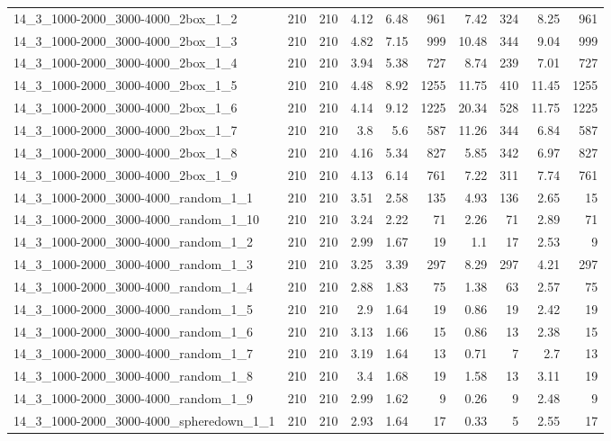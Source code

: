 \begin{center}
\begin{scriptsize}
\begin{longtable}{lrrrrrrrrr}
14\_3\_1000-2000\_3000-4000\_2box\_1\_2 & 210 & 210 & 4.12 & 6.48 & 961 & 7.42 & 324 & 8.25 & 961\\
14\_3\_1000-2000\_3000-4000\_2box\_1\_3 & 210 & 210 & 4.82 & 7.15 & 999 & 10.48 & 344 & 9.04 & 999\\
14\_3\_1000-2000\_3000-4000\_2box\_1\_4 & 210 & 210 & 3.94 & 5.38 & 727 & 8.74 & 239 & 7.01 & 727\\
14\_3\_1000-2000\_3000-4000\_2box\_1\_5 & 210 & 210 & 4.48 & 8.92 & 1255 & 11.75 & 410 & 11.45 & 1255\\
14\_3\_1000-2000\_3000-4000\_2box\_1\_6 & 210 & 210 & 4.14 & 9.12 & 1225 & 20.34 & 528 & 11.75 & 1225\\
14\_3\_1000-2000\_3000-4000\_2box\_1\_7 & 210 & 210 & 3.8 & 5.6 & 587 & 11.26 & 344 & 6.84 & 587\\
14\_3\_1000-2000\_3000-4000\_2box\_1\_8 & 210 & 210 & 4.16 & 5.34 & 827 & 5.85 & 342 & 6.97 & 827\\
14\_3\_1000-2000\_3000-4000\_2box\_1\_9 & 210 & 210 & 4.13 & 6.14 & 761 & 7.22 & 311 & 7.74 & 761\\
14\_3\_1000-2000\_3000-4000\_random\_1\_1 & 210 & 210 & 3.51 & 2.58 & 135 & 4.93 & 136 & 2.65 & 15\\
14\_3\_1000-2000\_3000-4000\_random\_1\_10 & 210 & 210 & 3.24 & 2.22 & 71 & 2.26 & 71 & 2.89 & 71\\
14\_3\_1000-2000\_3000-4000\_random\_1\_2 & 210 & 210 & 2.99 & 1.67 & 19 & 1.1 & 17 & 2.53 & 9\\
14\_3\_1000-2000\_3000-4000\_random\_1\_3 & 210 & 210 & 3.25 & 3.39 & 297 & 8.29 & 297 & 4.21 & 297\\
14\_3\_1000-2000\_3000-4000\_random\_1\_4 & 210 & 210 & 2.88 & 1.83 & 75 & 1.38 & 63 & 2.57 & 75\\
14\_3\_1000-2000\_3000-4000\_random\_1\_5 & 210 & 210 & 2.9 & 1.64 & 19 & 0.86 & 19 & 2.42 & 19\\
14\_3\_1000-2000\_3000-4000\_random\_1\_6 & 210 & 210 & 3.13 & 1.66 & 15 & 0.86 & 13 & 2.38 & 15\\
14\_3\_1000-2000\_3000-4000\_random\_1\_7 & 210 & 210 & 3.19 & 1.64 & 13 & 0.71 & 7 & 2.7 & 13\\
14\_3\_1000-2000\_3000-4000\_random\_1\_8 & 210 & 210 & 3.4 & 1.68 & 19 & 1.58 & 13 & 3.11 & 19\\
14\_3\_1000-2000\_3000-4000\_random\_1\_9 & 210 & 210 & 2.99 & 1.62 & 9 & 0.26 & 9 & 2.48 & 9\\
14\_3\_1000-2000\_3000-4000\_spheredown\_1\_1 & 210 & 210 & 2.93 & 1.64 & 17 & 0.33 & 5 & 2.55 & 17\\

\end{longtable}
\end{scriptsize}
\end{center}
